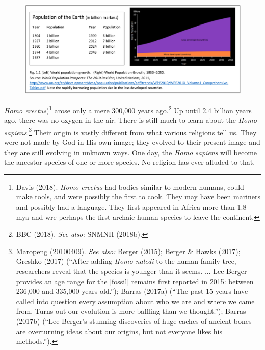 \begin{figure}[H]
\centering
\includegraphics[scale=1.15]{src/Figures/chap1/1.eps}
\end{figure}

\begin{multicols}{2}

\noindent
\textit{Homo erectus})\footnote{Davis (2018). \textit{Homo erectus} had bodies similar to modern humans, could make tools, and were possibly the first to cook. They may have been mariners and possibly had a language. They first appeared in Africa more than 1.8 mya and wre perhaps the first archaic human species to leave the continent.} arose only a mere 300,000 years ago.\footnote{BBC (2018). \textit{See also:} SNMNH (2018b).} Up until 2.4 billion years ago, there was no oxygen in the air. There is still much to learn about the \textit{Homo sapiens}.\footnote{Maropeng (20100409). \textit{See also:} Berger (2015); Berger \& Hawks (2017); Greshko (2017) (“After adding \textit{Homo naledi} to the human family tree, researchers reveal that the species is younger than it seems. ... Lee Berger--provides an age range for the [fossil] remains first reported in 2015: between 236,000 and 335,000 years old.”); Barras (2017a) (“The past 15 years have called into question every assumption about who we are and where we came from. Turns out our evolution is more baffling than we thought.”); Barras (2017b) (“Lee Berger’s stunning discoveries of huge caches of ancient bones are overturning ideas about our origins, but not everyone likes his methods.”).} Their origin is vastly different from what various religions tell us. They were not made by God in His own image; they evolved to their present image and they are still evolving in unknown ways. One day, the \textit{Homo sapiens} will become the ancestor species of one or more species. No religion has ever alluded to that.


\end{multicols}
